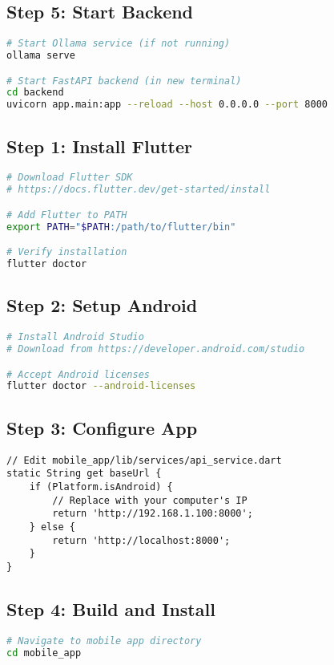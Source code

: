 \documentclass[11pt,a4paper]{report}
\begin{document}
\begin{itemize}
\subsection{Step 5: Start Backend}
\begin{lstlisting}[language=bash]
# Start Ollama service (if not running)
ollama serve

# Start FastAPI backend (in new terminal)
cd backend
uvicorn app.main:app --reload --host 0.0.0.0 --port 8000
\end{lstlisting}


\subsection{Step 1: Install Flutter}
\begin{lstlisting}[language=bash]
# Download Flutter SDK
# https://docs.flutter.dev/get-started/install

# Add Flutter to PATH
export PATH="$PATH:/path/to/flutter/bin"

# Verify installation
flutter doctor
\end{lstlisting}

\subsection{Step 2: Setup Android}
\begin{lstlisting}[language=bash]
# Install Android Studio
# Download from https://developer.android.com/studio

# Accept Android licenses
flutter doctor --android-licenses
\end{lstlisting}

\subsection{Step 3: Configure App}
\begin{lstlisting}
// Edit mobile_app/lib/services/api_service.dart
static String get baseUrl {
    if (Platform.isAndroid) {
        // Replace with your computer's IP
        return 'http://192.168.1.100:8000';
    } else {
        return 'http://localhost:8000';
    }
}
\end{lstlisting}

\subsection{Step 4: Build and Install}
\begin{lstlisting}[language=bash]
# Navigate to mobile app directory
cd mobile_app


\end{lstlisting}
\end{itemize}
\end{document}
